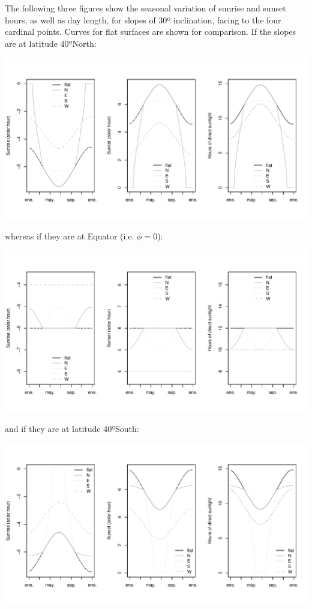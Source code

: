 \documentclass[11pt,a4paper]{article}
\begin{document}
The following three figures show the seasonal variation of sunrise and sunset hours, as well as day length, for slopes of 30º inclination, facing to the four cardinal points. Curves for flat surfaces are shown for comparison. If the slopes are at latitude 40ºNorth:
\begin{center}
\includegraphics{Meteorology-021}
\end{center}
whereas if they are at Equator (i.e. $\phi = 0$):
\begin{center}
\includegraphics{Meteorology-022}
\end{center}
and if they are at latitude 40ºSouth:
\begin{center}
\includegraphics{Meteorology-023}
\end{center}
\end{document}
